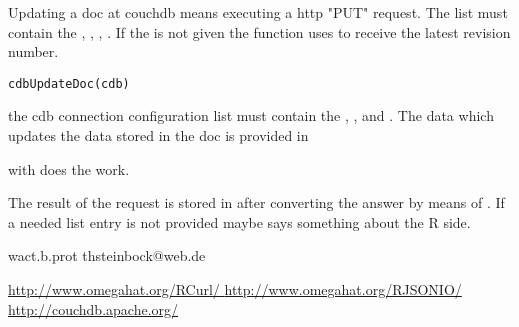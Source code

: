 \begin{Description}\relax
Updating a doc at couchdb means executing a http "PUT" request. The  
list must contain the , ,
, . If
the  is not given the function uses  to receive the
latest revision number.
\end{Description}
\begin{Usage}
\begin{verbatim}
cdbUpdateDoc(cdb)
\end{verbatim}
\end{Usage}
\begin{Arguments}
\begin{ldescription}
\item[\code{cdb}] the cdb connection configuration list must contain the ,
,   and  . The data which
updates the data stored in the doc is provided in 

\end{ldescription}
\end{Arguments}
\begin{Details}\relax
{} with  does the work.
\end{Details}
\begin{Value}
\begin{ldescription}
\item[\code{cdb }] The result of the request is stored in  after
converting the answer by means of  . If a needed
 list entry is not provided  maybe says
something about the R  side.

\end{ldescription}
\end{Value}
\begin{Author}\relax
wact.b.prot
thsteinbock@web.de
\end{Author}
\begin{References}\relax
\url{  http://www.omegahat.org/RCurl/   }
\url{  http://www.omegahat.org/RJSONIO/ }
\url{  http://couchdb.apache.org/       }
\end{References}
\begin{SeeAlso}\relax
{}
\end{SeeAlso}

